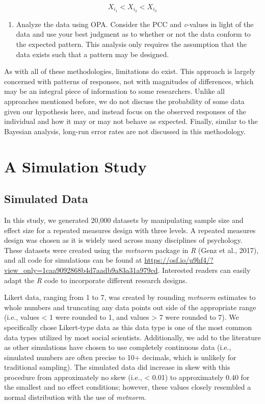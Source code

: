 \documentclass[,man, mask]{apa6}
\providecommand{\tightlist}{%
  \setlength{\itemsep}{0pt}\setlength{\parskip}{0pt}}
\begin{document}
\[
  X_{i_1} < X_{i_2} < X_{i_3}   
\]

\begin{enumerate}
\def\labelenumi{\arabic{enumi})}
\setcounter{enumi}{1}
\tightlist
\item
  Analyze the data using OPA. Consider the PCC and \emph{c}-values in light of the data and use your best judgment as to whether or not the data conform to the expected pattern. This analysis only requires the assumption that the data exists such that a pattern may be designed.
\end{enumerate}

As with all of these methodologies, limitations do exist. This approach is largely concerned with patterns of responses, not with magnitudes of differences, which may be an integral piece of information to some researchers. Unlike all approaches mentioned before, we do not discuss the probability of some data given our hypothesis here, and instead focus on the observed responses of the individual and how it may or may not behave as expected. Finally, similar to the Bayesian analysis, long-run error rates are not discussed in this methodology.

\hypertarget{a-simulation-study}{%
\section{A Simulation Study}\label{a-simulation-study}}

\hypertarget{simulated-data}{%
\subsection{Simulated Data}\label{simulated-data}}

In this study, we generated 20,000 datasets by manipulating sample size and effect size for a repeated measures design with three levels. A repeated measures design was chosen as it is widely used across many disciplines of psychology. These datasets were created using the \emph{mvtnorm} package in \emph{R} (Genz et al., 2017), and all code for simulations can be found at \url{https://osf.io/u9hf4/?view_only=1caa9092868b4d7aadb9a83a31a979cd}. Interested readers can easily adapt the \emph{R} code to incorporate different research designs.

Likert data, ranging from 1 to 7, was created by rounding \emph{mvtnorm} estimates to whole numbers and truncating any data points out side of the appropriate range (i.e., values \textless{} 1 were rounded to 1, and values \textgreater{} 7 were rounded to 7). We specifically chose Likert-type data as this data type is one of the most common data types utilized by most social scientists. Additionally, we add to the literature as other simulations have chosen to use completely continuous data (i.e., simulated numbers are often precise to 10+ decimals, which is unlikely for traditional sampling). The simulated data did increase in skew with this procedure from approximately no skew (i.e., \textless{} 0.01) to approximately 0.40 for the smallest and no effect conditions; however, these values closely resembled a normal distribution with the use of \emph{mvtnorm}.
\end{document}
